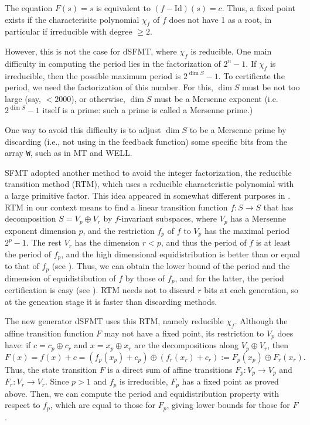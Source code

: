\documentclass{svmult}
\begin{document}
The equation $F(s)=s$ is equivalent to $(f-\textrm{Id})(s)=c$.
Thus, a fixed point exists 
if the characterisitc polynomial $\chi_f$ of $f$ 
does not have 1 as a root, 
in particular if irreducible with degree $\geq 2$.

However, this is not the case for dSFMT, where 
$\chi_f$ is reducible. One main difficulty in 
computing the period lies in the factorization of
$2^n-1$. If $\chi_f$ is irreducible, then the 
possible maximum period is $2^{\dim S}-1$. 
To certificate the period, we need the factorization 
of this number. For this, $\dim S$ must be not too
large (say, $<2000$), or otherwise, $\dim S$ must be a Mersenne
exponent (i.e. $2^{\dim S}-1$ itself is a prime:
such a prime is called a Mersenne prime.)

One way to avoid this difficulty is to adjust $\dim S$
to be a Mersenne prime by discarding (i.e., not using in the feedback function)
some specific bits from the array \texttt{W}, such as in 
MT and WELL\cite{WELL}.
 
SFMT adopted another method to avoid the integer factorization, the
reducible transition method (RTM), which uses a reducible
characteristic polynomial with a large primitive factor.  This idea
appeared in somewhat different purposes in 
\cite{FUSHIMI90} \cite{BRENT}\cite{BRENT-PRIM}.
RTM in our context means to find a linear transition function $f:S \to S$
that has decomposition $S=V_p\oplus V_r$
by $f$-invariant subspaces, where $V_p$ has 
a Mersenne exponent dimension $p$, and the restriction 
$f_p$ of $f$ to $V_p$ has the maximal period $2^p-1$.
The rest $V_r$ has the dimension $r < p$, and thus
the period of $f$ is at least the period of $f_p$,
and the high dimensional equidistribution is 
better than or equal to that of $f_p$ (see \cite{SFMT}).
Thus, we can obtain the lower bound of the period
and the dimension of equidistibution of $f$ by 
those of $f_p$, and for the latter, the period certification
is easy (see \cite[\S3.2.2]{knuth:bible}).
RTM needs not to discard $r$ bits at each generation, 
so at the geneation stage it is faster than discarding 
methods. 

The new generator dSFMT uses this RTM, namely reducible $\chi_f$.
Although the affine transition function $F$ may not have
a fixed point, its restriction to $V_p$ does have:
if $c=c_p\oplus c_r$ and $x=x_p\oplus x_r$ are
the decompositions along $V_p\oplus V_r$, then
\begin{equation}\label{eq:decomp-F}
F(x)=f(x)+c=(f_p(x_p)+c_p) \oplus (f_r(x_r)+c_r):=F_p(x_p)\oplus F_r(x_r).
\end{equation}
Thus, the state transition $F$ is a direct sum of affine transitions
$F_p: V_p \to V_p$ and $F_r: V_r \to V_r$. Since $p>1$ and
$f_p$ is irreducible, $F_p$ has a fixed point as proved above.
Then, we can compute the period and equidistribution 
property with respect to $f_p$, which are equal to 
those for $F_p$, giving lower bounds for those for $F$.
\end{document}
